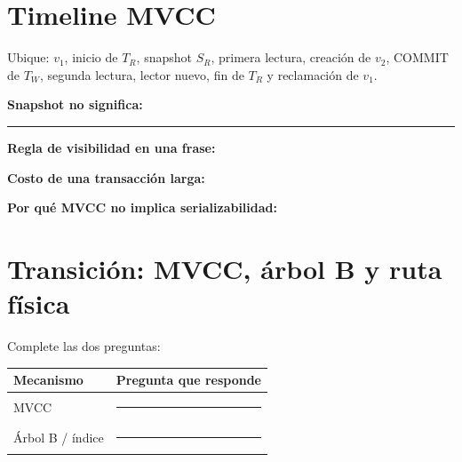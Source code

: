 \documentclass[variant=guia,cover=institutional,mode=print]{ua-engineering-v6-article}
\begin{document}
\newpage
\section{Timeline MVCC}

Ubique: $v_1$, inicio de $T_R$, snapshot $S_R$, primera lectura, creación de $v_2$, COMMIT de $T_W$, segunda lectura, lector nuevo, fin de $T_R$ y reclamación de $v_1$.

\begin{center}
\end{center}

\textbf{Snapshot no significa:} \rule{0.58\textwidth}{0.4pt}

\textbf{Regla de visibilidad en una frase:}

\vspace{1.0cm}

\textbf{Costo de una transacción larga:}

\vspace{1.0cm}

\textbf{Por qué MVCC no implica serializabilidad:}

\vspace{1.0cm}

\newpage
\section{Transición: MVCC, árbol B y ruta física}

Complete las dos preguntas:

\begin{center}
\begin{tabular}{p{}p{}}
\toprule
Mecanismo & Pregunta que responde \\
\midrule
MVCC & \rule{0.55\textwidth}{0.4pt} \\[0.6cm]
Árbol B / índice & \rule{0.55\textwidth}{0.4pt} \\[0.6cm]
\bottomrule
\end{tabular}
\end{center}
\end{document}
